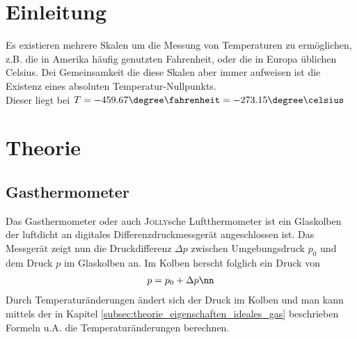 \documentclass[12pt, a4paper, twoside]{scrartcl}
\newcommand{\person}[1]{\textsc{#1}}
\begin{document}

\cleardoublepage
\tableofcontents
\cleardoublepage
\setcounter{page}{1}

\section{Einleitung}
\label{sec:einleitung}
Es existieren mehrere Skalen um die Messung von Temperaturen zu ermöglichen, z.B. die in Amerika häufig genutzten Fahrenheit, oder die in Europa üblichen Celsius. Dei Gemeinsamkeit die diese Skalen aber immer aufweisen ist die Existenz eines absoluten Temperatur-Nullpunkts.
\\
Dieser liegt bei $T = -459.67\degree\fahrenheit = -273.15\degree\celsius$

\section{Theorie}
\label{sec:theorie}

\subsection{Gasthermometer}
Das Gasthermometer oder auch \person{Jolly}sche Luftthermometer ist ein Glaskolben der luftdicht an digitales Differenzdruckmessgerät angeschlossen ist. Das Messgerät zeigt nun die Druckdifferenz $\Delta p$ zwischen Umgebungsdruck $p_0$ und dem Druck $p$ im Glaskolben an. Im Kolben herscht folglich ein Druck von
\begin{align}
 p = p_0 + \Delta p \nn
\end{align}
Durch Temperaturänderungen ändert sich der Druck im Kolben und man kann mittels der in Kapitel \ref{subsec:theorie_eigenschaften_ideales_gas} beschrieben Formeln u.A. die Temperaturänderungen berechnen.
\end{document}
